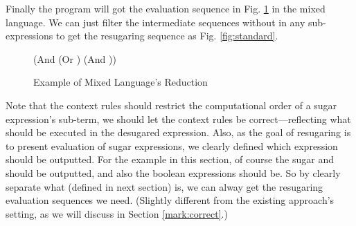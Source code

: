 Finally the program  will got the evaluation sequence in Fig.  \ref{fig:mixexec} in the mixed language. We can just filter the intermediate sequences without  in any sub-expressions to get the resugaring sequence as Fig.  \ref{fig:standard}.

\begin{figure}[thb]
\begin{center}
\begin{footnotesize}
\begin{Codes}
    (And (Or \true \false) (And \false \true))
\OneStep{ \false}
\end{Codes}
\end{footnotesize}
\end{center}
\caption{Example of Mixed Language's Reduction}
\label{fig:mixexec}
\end{figure}

Note that the context rules should restrict the computational order of a sugar expression's sub-term, we should let the context rules be correct---reflecting what should be executed in the desugared expression. Also, as the goal of resugaring is to present evaluation of sugar expressions, we clearly defined which expression should be outputted. For the example in this section, of course the sugar  and  should be outputted, and also the boolean expressions should be. So by clearly separate what  (defined in next section) is, we can alway get the resugaring evaluation sequences we need. (Slightly different from the existing approach's setting, as we will discuss in Section \ref{mark:correct}.)